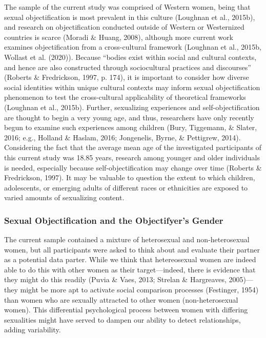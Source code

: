 \documentclass[
  man]{apa6}
\begin{document}
The sample of the current study was comprised of Western women, being
that sexual objectification is most prevalent in this culture (Loughnan
et al., 2015b), and research on objectification conducted outside of
Western or Westernized countries is scarce (Moradi \& Huang, 2008),
although more current work examines objectification from a
cross-cultural framework (Loughnan et al., 2015b, Wollast et al.
(2020)). Because \enquote{bodies exist within social and cultural
contexts, and hence are also constructed through sociocultural practices
and discourses} (Roberts \& Fredrickson, 1997, p. 174), it is important
to consider how diverse social identities within unique cultural
contexts may inform sexual objectification phenomenon to test the
cross-cultural applicability of theoretical frameworks (Loughnan et al.,
2015b). Further, sexualizing experiences and self-objectification are
thought to begin a very young age, and thus, researchers have only
recently begun to examine such experiences among children (Bury,
Tiggemann, \& Slater, 2016; e.g., Holland \& Haslam, 2016; Jongenelis,
Byrne, \& Pettigrew, 2014). Considering the fact that the average mean
age of the investigated participants of this current study was 18.85
years, research among younger and older individuals is needed,
especially because self-objectification may change over time (Roberts \&
Fredrickson, 1997). It may be valuable to question the extent to which
children, adolescents, or emerging adults of different races or
ethnicities are exposed to varied amounts of sexualizing content.

\subsubsection{Sexual Objectification and the Objectifyer's
Gender}\label{sexual-objectification-and-the-objectifyers-gender}

The current sample contained a mixture of heterosexual and
non-heterosexual women, but all participants were asked to think about
and evaluate their partner as a potential data parter. While we think
that hetereosexual women are indeed able to do this with other women as
their target---indeed, there is evidence that they might do this readily
(Puvia \& Vaes, 2013; Strelan \& Hargreaves, 2005)---they might be more
apt to activate social comparison processes (Festinger, 1954) than women
who are sexually attracted to other women (non-heterosexual women). This
differential psychological process between women with differing
sexualities might have served to dampen our ability to detect
relationships, adding variability.
\end{document}
